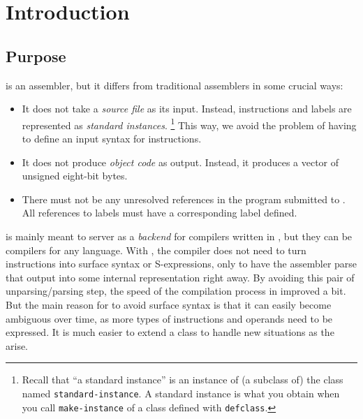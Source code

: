 \chapter{Introduction}
%

\section{Purpose}

\sysname{} is an assembler, but it differs from traditional assemblers
in some crucial ways:

\begin{itemize}
\item It does not take a \emph{source file} as its input.  Instead,
  instructions and labels are represented as \emph{standard
    instances}.%
\footnote{Recall that ``a standard instance'' is an instance of (a
  subclass of) the class named \texttt{standard-instance}.  A standard
  instance is what you obtain when you call \texttt{make-instance} of
  a class defined with \texttt{defclass}.}  This way, we avoid the
problem of having to define an input syntax for instructions.
\item It does not produce \emph{object code} as output.  Instead, it
  produces a \commonlisp{} vector of unsigned eight-bit bytes.
\item There must not be any unresolved references in the program
  submitted to \sysname{}.  All references to labels must have a
  corresponding label defined.
\end{itemize}

\sysname{} is mainly meant to server as a \emph{backend} for
compilers written in \commonlisp{}, but they can be compilers for any
language.  With \sysname{}, the compiler does not need to turn
instructions into surface syntax or S-expressions, only to have the
assembler parse that output into some internal representation right
away.  By avoiding this pair of unparsing/parsing step, the
speed of the compilation process in improved a bit.  But the main
reason for \sysname{} to avoid surface syntax is that it can easily
become ambiguous over time, as more types of instructions and operands
need to be expressed.  It is much easier to extend a \clos{} class to
handle new situations as the arise.
